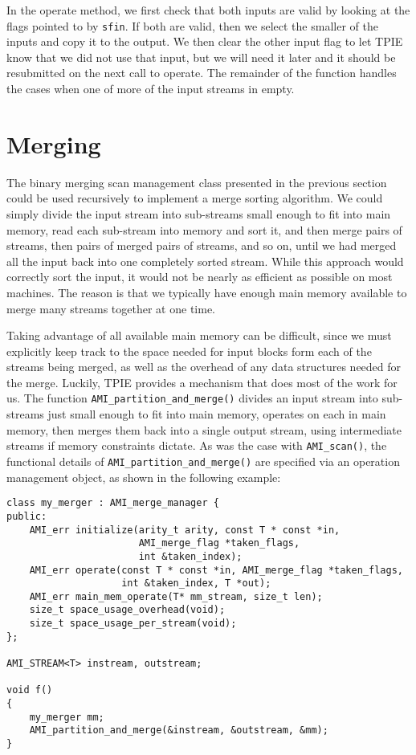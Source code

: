 In the operate method, we first check that both inputs are valid by
looking at the flags pointed to by \verb|sfin|.  If both are valid,
then we select the smaller of the inputs and copy it to the output.
We then clear the other input flag to let TPIE know that we did not
use that input, but we will need it later and it should be resubmitted
on the next call to operate.  The remainder of the function handles
the cases when one of more of the input streams in empty.

\section{Merging} \label{sec:merging}

The binary merging scan management class presented in the previous
section could be used recursively to implement a merge
sorting algorithm.  We could simply divide
the input stream into sub-streams small enough to fit into main
memory, read each sub-stream into memory and sort it, and then merge
pairs of streams, then pairs of merged pairs of streams, and so on,
until we had merged all the input back into one completely sorted
stream.  While this approach would correctly sort the input, it would
not be nearly as efficient as possible on most machines.  The reason
is that we typically have enough main memory available to merge many
streams together at one time.

Taking advantage of all available main memory can be difficult, since
we must explicitly keep track to the space needed for input blocks
form each of the streams being merged, as well as the overhead of any
data structures needed for the merge.  Luckily, TPIE provides a
mechanism that does most of the work for us.  The function
\verb|AMI_partition_and_merge()| divides an input stream into
sub-streams just small enough to fit into main memory, operates on
each in main memory, then merges them back into a single output
stream, using intermediate streams if memory constraints dictate.  As
was the case with \verb|AMI_scan()|, the functional details of
\verb|AMI_partition_and_merge()| are specified via an operation
management object, as shown in the
following example:

\begin{verbatim}
class my_merger : AMI_merge_manager {
public:
    AMI_err initialize(arity_t arity, const T * const *in,
                       AMI_merge_flag *taken_flags,
                       int &taken_index);
    AMI_err operate(const T * const *in, AMI_merge_flag *taken_flags,
                    int &taken_index, T *out);
    AMI_err main_mem_operate(T* mm_stream, size_t len);
    size_t space_usage_overhead(void);
    size_t space_usage_per_stream(void);
};

AMI_STREAM<T> instream, outstream;

void f() 
{
    my_merger mm;    
    AMI_partition_and_merge(&instream, &outstream, &mm);
}
\end{verbatim}

